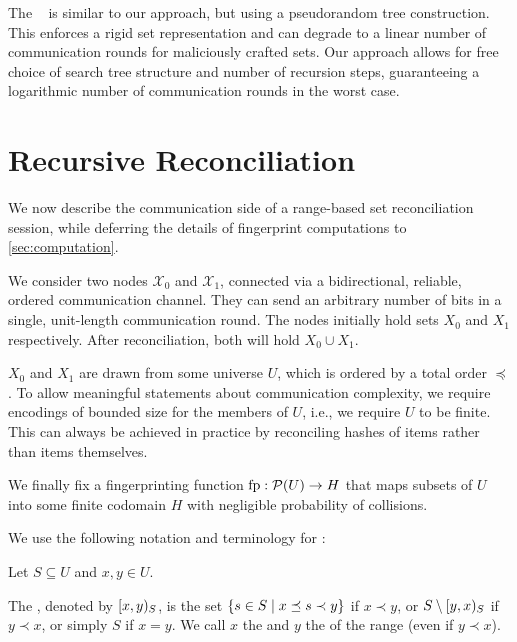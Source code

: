 \documentclass[conference]{IEEEtran}
\newcommand{\peer}[1]{\ensuremath{\mathcal{X}_{#1}}}
\begin{document}
The ~\cite{auvolat2019merkle} is similar to our approach, but using a pseudorandom tree construction. This enforces a rigid set representation and can degrade to a linear number of communication rounds for maliciously crafted sets. Our approach allows for free choice of search tree structure and number of recursion steps, guaranteeing a logarithmic number of communication rounds in the worst case.

\section{Recursive Reconciliation}\label{reconciliation}

We now describe the communication side of a range-based set reconciliation session, while deferring the details of fingerprint computations to \cref{sec:computation}. 

We consider two nodes \peer{0} and \peer{1}, connected via a bidirectional, reliable, ordered communication channel. They can send an arbitrary number of bits in a single, unit-length communication round. The nodes initially hold sets $X_0$ and $X_1$ respectively. After reconciliation, both will hold $X_0 \cup X_1$.

$X_0$ and $X_1$ are drawn from some universe $U$, which is ordered by a total order $\preceq$. To allow meaningful statements about communication complexity, we require encodings of bounded size for the members of $U$, i.e., we require $U$ to be finite. This can always be achieved in practice by reconciling hashes of items rather than items themselves.

We finally fix a fingerprinting function ${\operatorname{fp}}: {\mathcal{P}({U})} \rightarrow {H}$ that maps subsets of $U$ into some finite codomain $H$ with negligible probability of collisions.

We use the following notation and terminology for :

\begin{definition}
\label{def:ranges}
Let $S \subseteq U$  and $x, y \in U$.

The , denoted by $[{x},{y})_{S}$, is the set $\{s \in S \mid x \preceq s \prec y\}$ if $x \prec y$, or $S \setminus [{y},{x})_{S}$ if $y \prec x$, or simply $S$ if $x = y$. We call $x$ the  and $y$ the  of the range (even if $y \prec x$).
\end{definition}
\end{document}
